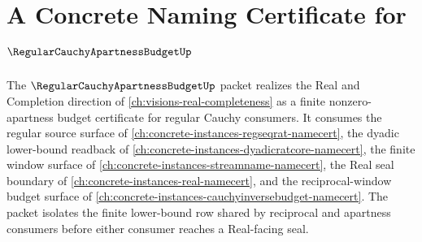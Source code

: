 \chapter{A Concrete Naming Certificate for $\RegularCauchyApartnessBudgetUp$}
\label{ch:concrete-instances-regular-cauchy-apartness-budget-namecert}

The $\RegularCauchyApartnessBudgetUp$ packet realizes the Real and Completion direction of \autoref{ch:visions-real-completeness} as a finite nonzero-apartness budget certificate for regular Cauchy consumers. It consumes the regular source surface of \autoref{ch:concrete-instances-regseqrat-namecert}, the dyadic lower-bound readback of \autoref{ch:concrete-instances-dyadicratcore-namecert}, the finite window surface of \autoref{ch:concrete-instances-streamname-namecert}, the Real seal boundary of \autoref{ch:concrete-instances-real-namecert}, and the reciprocal-window budget surface of \autoref{ch:concrete-instances-cauchyinversebudget-namecert}. The packet isolates the finite lower-bound row shared by reciprocal and apartness consumers before either consumer reaches a Real-facing seal.

